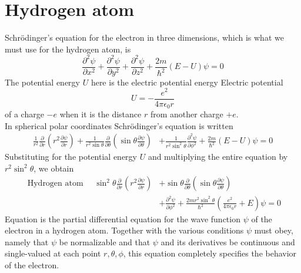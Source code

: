 \section{Hydrogen atom }
Schrödinger's equation for the electron in three dimensions, which is what we must use for the hydrogen atom, is
$$
\frac{\partial^{2} \psi}{\partial x^{2}}+\frac{\partial^{2} \psi}{\partial y^{2}}+\frac{\partial^{2} \psi}{\partial z^{2}}+\frac{2 m}{\hbar^{2}}(E-U) \psi=0
$$
The potential energy $U$ here is the electric potential energy
Electric potential
$$
U=-\frac{e^{2}}{4 \pi \epsilon_{0} r}
$$
of a charge $-e$ when it is the distance $r$ from another charge $+e$.\\
In spherical polar coordinates Schrödinger's equation is written
$$
\begin{aligned}
\frac{1}{r^{2}} \frac{\partial}{\partial r}\left(r^{2} \frac{\partial \psi}{\partial r}\right)+\frac{1}{r^{2} \sin \theta} \frac{\partial}{\partial \theta}\left(\sin \theta \frac{\partial \psi}{\partial \theta}\right) &+\frac{1}{r^{2} \sin ^{2} \theta} \frac{\partial^{2} \psi}{\partial \phi^{2}}+\frac{2 m}{\hbar^{2}}(E-U) \psi=0
\end{aligned}
$$
Substituting  for the potential energy $U$ and multiplying the entire equation by $r^{2} \sin ^{2} \theta$, we obtain
$$
\begin{aligned}
\text { Hydrogen atom } \quad \sin ^{2} \theta \frac{\partial}{\partial r}\left(r^{2} \frac{\partial \psi}{\partial r}\right) &+\sin \theta \frac{\partial}{\partial \theta}\left(\sin \theta \frac{\partial \psi}{\partial \theta}\right) \\
&+\frac{\partial^{2} \psi}{\partial \phi^{2}}+\frac{2 m r^{2} \sin ^{2} \theta}{\hbar^{2}}\left(\frac{e^{2}}{4 \pi \epsilon_{0} r}+E\right) \psi=0
\end{aligned}
$$
Equation is the partial differential equation for the wave function $\psi$ of the electron in a hydrogen atom. Together with the various conditions $\psi$ must obey, namely that $\psi$ be normalizable and that $\psi$ and its derivatives be continuous and single-valued at each point $r, \theta, \phi$, this equation completely specifies the behavior of the electron.
